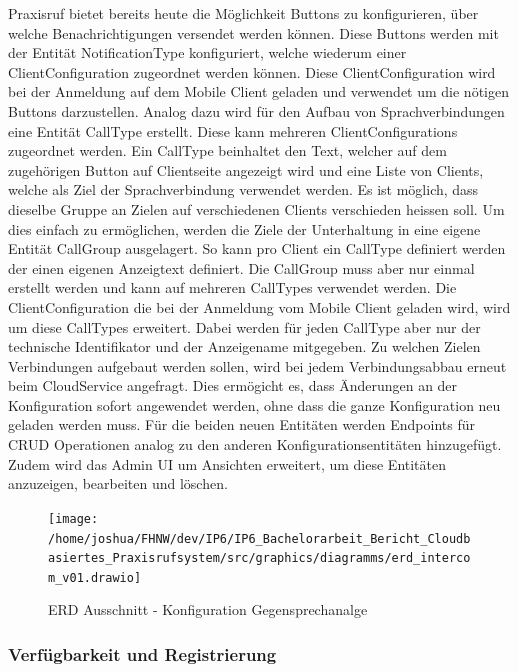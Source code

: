 Praxisruf bietet bereits heute die Möglichkeit Buttons zu konfigurieren, über welche Benachrichtigungen versendet werden können.
Diese Buttons werden mit der Entität NotificationType konfiguriert, welche wiederum einer ClientConfiguration zugeordnet werden können.
Diese ClientConfiguration wird bei der Anmeldung auf dem Mobile Client geladen und verwendet um die nötigen Buttons darzustellen.
Analog dazu wird für den Aufbau von Sprachverbindungen eine Entität CallType erstellt.
Diese kann mehreren ClientConfigurations zugeordnet werden.
Ein CallType beinhaltet den Text, welcher auf dem zugehörigen Button auf Clientseite angezeigt wird und eine Liste von
Clients, welche als Ziel der Sprachverbindung verwendet werden.
Es ist möglich, dass dieselbe Gruppe an Zielen auf verschiedenen Clients verschieden heissen soll.
Um dies einfach zu ermöglichen, werden die Ziele der Unterhaltung in eine eigene Entität CallGroup ausgelagert.
So kann pro Client ein CallType definiert werden der einen eigenen Anzeigtext definiert.
Die CallGroup muss aber nur einmal erstellt werden und kann auf mehreren CallTypes verwendet werden.
Die ClientConfiguration die bei der Anmeldung vom Mobile Client geladen wird, wird um diese CallTypes erweitert.
Dabei werden für jeden CallType aber nur der technische Identifikator und der Anzeigename mitgegeben.
Zu welchen Zielen Verbindungen aufgebaut werden sollen, wird bei jedem Verbindungsabbau erneut beim CloudService angefragt.
Dies ermögicht es, dass Änderungen an der Konfiguration sofort angewendet werden, ohne dass die ganze Konfiguration neu geladen werden muss.
Für die beiden neuen Entitäten werden Endpoints für CRUD Operationen analog zu den anderen Konfigurationsentitäten hinzugefügt.
Zudem wird das Admin UI um Ansichten erweitert, um diese Entitäten anzuzeigen, bearbeiten und löschen.

\begin{figure}[h]
    \centering
    \begin{minipage}[b]{0.7\textwidth}
        \texttt{[image: /home/joshua/FHNW/dev/IP6/IP6\_Bachelorarbeit\_Bericht\_Cloudbasiertes\_Praxisrufsystem/src/graphics/diagramms/erd\_intercom\_v01.drawio]}
        \caption{ERD Ausschnitt - Konfiguration Gegensprechanalge}
    \end{minipage}
\end{figure}

\clearpage
\subsubsection{Verfügbarkeit und Registrierung}

